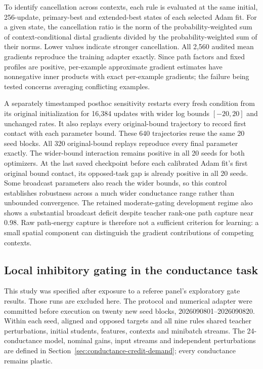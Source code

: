 To identify cancellation across contexts, each rule is evaluated at the same initial, 256-update, primary-best and extended-best states of each selected Adam fit. For a given state, the cancellation ratio is the norm of the probability-weighted sum of context-conditional distal gradients divided by the probability-weighted sum of their norms. Lower values indicate stronger cancellation. All 2,560 audited mean gradients reproduce the training adapter exactly. Since path factors and fixed profiles are positive, per-example approximate gradient estimates have nonnegative inner products with exact per-example gradients; the failure being tested concerns averaging conflicting examples.

A separately timestamped posthoc sensitivity restarts every fresh condition from its original initialization for 16,384 updates with wider log bounds $[-20,20]$ and unchanged rates. It also replays every original-bound trajectory to record first contact with each parameter bound. These 640 trajectories reuse the same 20 seed blocks. All 320 original-bound replays reproduce every final parameter exactly. The wider-bound interaction remains positive in all 20 seeds for both optimizers. At the last saved checkpoint before each calibrated Adam fit's first original bound contact, its opposed-task gap is already positive in all 20 seeds. Some broadcast parameters also reach the wider bounds, so this control establishes robustness across a much wider conductance range rather than unbounded convergence. The retained moderate-gating development regime also shows a substantial broadcast deficit despite teacher rank-one path capture near 0.98. Raw path-energy capture is therefore not a sufficient criterion for learning: a small spatial component can distinguish the gradient contributions of competing contexts.

\subsection{Local inhibitory gating in the conductance task}
\label{sec:local_conductance_gate}
\label{sec:review_followups}
This study was specified after exposure to a referee panel's exploratory gate results. Those runs are excluded here. The protocol and numerical adapter were committed before execution on twenty new seed blocks, 2026090801--2026090820. Within each seed, aligned and opposed targets and all nine rules shared teacher perturbations, initial students, features, contexts and minibatch streams. The 24-conductance model, nominal gains, input streams and independent perturbations are defined in Section~\ref{sec:conductance-credit-demand}; every conductance remains plastic.

